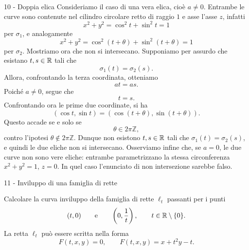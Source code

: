 \documentclass[a4paper]{article}
\begin{document}
\begin{snippetsolution}{10 - Doppia elica}
    Consideriamo il caso di una vera elica, cioè \(a\neq 0\). Entrambe le curve sono contenute nel cilindro circolare retto di raggio \(1\) e asse l'asse \(z\), infatti
    \[
        x^2+y^2=\cos^2t+\sin^2t=1
    \]
    per \(\sigma_1\), e analogamente
    \[
        x^2+y^2=\cos^2(t+\theta)+\sin^2(t+\theta)=1
    \]
    per \(\sigma_2\).
    Mostriamo ora che non si intersecano. Supponiamo per assurdo che esistano \(t,s\in\mathbb{R}\) tali che
    \[
        \sigma_1(t)=\sigma_2(s).
    \]
    Allora, confrontando la terza coordinata, otteniamo
    \[
        at=as.
    \]
    Poiché \(a\neq0\), segue che
    \[
        t=s.
    \]
    Confrontando ora le prime due coordinate, si ha
    \[
        (\cos t,\sin t)=(\cos(t+\theta),\sin(t+\theta)).
    \]
    Questo accade se e solo se
    \[
        \theta\in 2\pi\mathbb{Z},
    \]
    contro l'ipotesi \(\theta\notin2\pi\mathbb{Z}\). Dunque non esistono \(t,s\in\mathbb{R}\) tali che \(\sigma_1(t)=\sigma_2(s)\), e quindi le due eliche non si intersecano.
    Osserviamo infine che, se \(a=0\), le due curve non sono vere eliche: entrambe parametrizzano la stessa circonferenza \(x^2+y^2=1\), \(z=0\). In quel caso l'enunciato di non intersezione sarebbe falso.
\end{snippetsolution}

\pagebreak

\begin{snippetexercise}{11 - Inviluppo di una famiglia di rette}
    \begin{figure}
        \begin{center}
            \vspace{-1cm}
        \end{center}
    \end{figure}
    Calcolare la curva inviluppo della famiglia di rette \(\ell_t\)
    passanti per i punti
    \[
        (t,0)
        \qquad\text{e}\qquad
        \left(0,\frac{1}{t}\right),
        \qquad
        t\in\mathbb{R}\setminus\{0\}.
    \]
    La retta \(\ell_t\) può essere scritta nella forma
    \[
        F(t,x,y)=0,
        \qquad
        F(t,x,y)=x+t^2y-t.
    \]
    \wrapfill
\end{snippetexercise}
\end{document}
